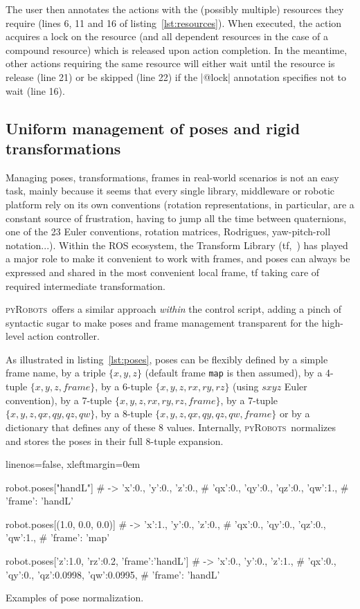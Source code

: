 \documentclass[a4paper, 10pt, conference]{ieeeconf}      %
\newcommand{\pyRobots}{\textsc{pyRobots}\ }
\begin{document}
The user then annotates the actions with the (possibly multiple) resources they
require (lines 6, 11 and 16 of listing~\ref{lst:resources}). When executed, the
action acquires a lock on the resource (and all dependent resources in the case
of a compound resource) which is released upon action completion. In the
meantime, other actions requiring the same resource will either wait until the
resource is release (line 21) or be skipped (line 22) if the \python|@lock|
annotation specifies not to wait (line 16).


\subsection{Uniform management of poses and rigid transformations}

Managing poses, transformations, frames in real-world scenarios is not an easy
task, mainly because it seems that every single library, middleware or robotic
platform rely on its own conventions (rotation representations, in particular,
are a constant source of frustration, having to jump all the time between
quaternions, one of the 23 Euler conventions, rotation matrices, Rodrigues,
yaw-pitch-roll notation...). Within the ROS ecosystem, the Transform Library
(tf,~\cite{foote2013tf}) has played a major role to make it convenient to work
with frames, and poses can always be expressed and shared in the most convenient
local frame, tf taking care of required intermediate transformation.

\pyRobots offers a similar approach \emph{within} the control script, adding a
pinch of syntactic sugar to make poses and frame management transparent for the
high-level action controller.

As illustrated in listing~\ref{lst:poses}, poses can be flexibly defined by a
simple frame name, by a triple $\{x, y, z\}$ (default frame {\tt map} is then
assumed), by a 4-tuple $\{x, y, z, frame\}$, by a 6-tuple $\{x, y, z, rx, ry,
rz\}$ (using $sxyz$ Euler convention), by a 7-tuple $\{x, y, z, rx, ry, rz,
frame\}$, by a 7-tuple $\{x, y, z, qx, qy, qz, qw\}$, by a 8-tuple $\{x, y, z,
qx, qy, qz, qw, frame\}$ or by a dictionary that defines any of these 8 values.
Internally, \pyRobots normalizes and stores the poses in their full 8-tuple
expansion.

\begin{listing}[H]
    \begin{pythoncode*}{linenos=false, xleftmargin=0em}

    robot.poses["handL"]
    # -> {'x':0., 'y':0., 'z':0., 
    #    'qx':0., 'qy':0., 'qz':0., 'qw':1., 
    #    'frame': 'handL'}

    robot.poses[(1.0, 0.0, 0.0)]
    # -> {'x':1., 'y':0., 'z':0., 
    #    'qx':0., 'qy':0., 'qz':0., 'qw':1., 
    #    'frame': 'map'}

    robot.poses[{'z':1.0, 'rz':0.2, 'frame':'handL'}]
    # -> {'x':0., 'y':0., 'z':1., 
    #    'qx':0., 'qy':0., 'qz':0.0998, 'qw':0.0995, 
    #    'frame': 'handL'}

\end{pythoncode*}
\caption{Examples of pose normalization.}
\label{lst:poses}
\end{listing}
\end{document}
